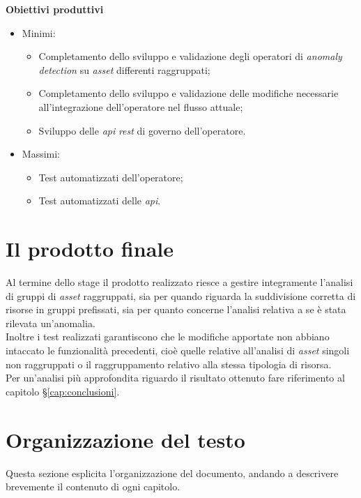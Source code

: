 \noindent \textbf{Obiettivi produttivi}
\begin{itemize}
	\item{Minimi:
		\begin{itemize}
			\item{Completamento dello sviluppo e validazione degli operatori di \textit{anomaly detection} su \textit{asset} differenti raggruppati;}
			\item{Completamento dello sviluppo e validazione delle modifiche necessarie all'integrazione dell'operatore nel flusso attuale;}
			\item{Sviluppo delle \textit{\gls{api}} \textit{\gls{rest}} di governo dell'operatore.}
		\end{itemize}			
	}
	\item{Massimi:
		\begin{itemize}
			\item{Test automatizzati dell'operatore;}
			\item{Test automatizzati delle \textit{\gls{api}}.}
		\end{itemize}			
	}
\end{itemize}


\section{Il prodotto finale}
Al termine dello stage il prodotto realizzato riesce a gestire integramente l'analisi di gruppi di \textit{asset} raggruppati, sia per quando riguarda la suddivisione corretta di risorse in gruppi prefissati, sia per quanto concerne l'analisi relativa a se è stata rilevata un'anomalia.\\
Inoltre i test realizzati garantiscono che le modifiche apportate non abbiano intaccato le funzionalità precedenti, cioè quelle relative all'analisi di \textit{asset} singoli non raggruppati o il raggruppamento relativo alla stessa tipologia di risorsa.\\
Per un'analisi più approfondita riguardo il risultato ottenuto fare riferimento al capitolo \S\ref{cap:conclusioni}.




\section{Organizzazione del testo}
Questa sezione esplicita l'organizzazione del documento, andando a descrivere brevemente il contenuto di ogni capitolo.

